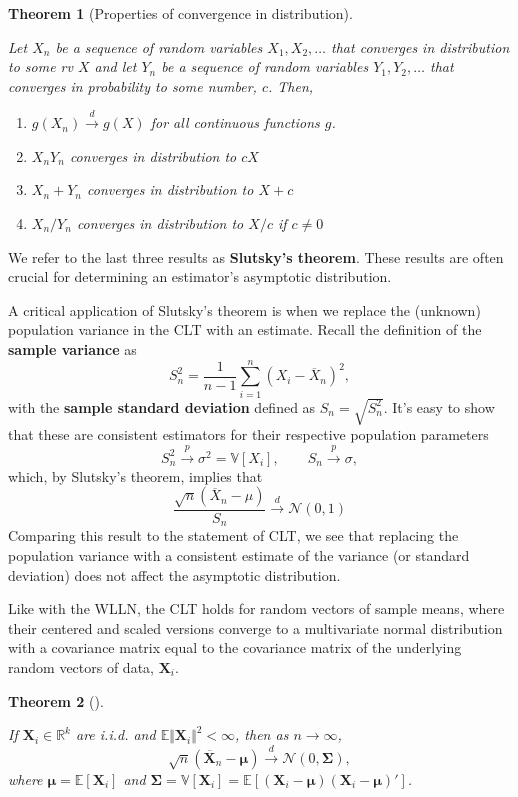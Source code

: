 \documentclass[
  13pt,
  letterpaper,
  DIV=11,
  numbers=noendperiod]{scrreprt}
\providecommand{\tightlist}{%
  \setlength{\itemsep}{0pt}\setlength{\parskip}{0pt}}\usepackage{longtable,booktabs,array}
\newcommand{\mb}{\symbf}
\newcommand{\E}{\mathbb{E}}
\newcommand{\V}{\mathbb{V}}
\newcommand{\N}{\mathcal{N}}
\newcommand{\Xbar}{\overline{X}}
\newcommand{\X}{\mb{X}}
\newcommand{\inprob}{\overset{p}{\to}}
\newcommand{\indist}{\overset{d}{\to}}
\theoremstyle{plain}
\newtheorem{theorem}{Theorem}[chapter]
\theoremstyle{definition}
\theoremstyle{definition}
\theoremstyle{remark}
\begin{document}
\begin{theorem}[Properties of convergence in
distribution]\protect\hypertarget{thm-indist-properties}{}\label{thm-indist-properties}

Let \(X_n\) be a sequence of random variables \(X_1, X_2,\ldots\) that
converges in distribution to some rv \(X\) and let \(Y_n\) be a sequence
of random variables \(Y_1, Y_2,\ldots\) that converges in probability to
some number, \(c\). Then,

\begin{enumerate}
\def\labelenumi{\arabic{enumi}.}
\tightlist
\item
  \(g(X_n) \indist g(X)\) for all continuous functions \(g\).
\item
  \(X_nY_n\) converges in distribution to \(cX\)
\item
  \(X_n + Y_n\) converges in distribution to \(X + c\)
\item
  \(X_n / Y_n\) converges in distribution to \(X / c\) if \(c \neq 0\)
\end{enumerate}

\end{theorem}

We refer to the last three results as \textbf{Slutsky's theorem}. These
results are often crucial for determining an estimator's asymptotic
distribution.

A critical application of Slutsky's theorem is when we replace the
(unknown) population variance in the CLT with an estimate. Recall the
definition of the \textbf{sample variance} as \[
S_n^2 = \frac{1}{n-1} \sum_{i=1}^n (X_i - \Xbar_n)^2,
\] with the \textbf{sample standard deviation} defined as
\(S_{n} = \sqrt{S_{n}^2}\). It's easy to show that these are consistent
estimators for their respective population parameters \[ 
S_{n}^2 \inprob \sigma^2 = \V[X_i], \qquad S_{n} \inprob \sigma,
\] which, by Slutsky's theorem, implies that \[
\frac{\sqrt{n}\left(\Xbar_n - \mu\right)}{S_n} \indist \N(0, 1)
\] Comparing this result to the statement of CLT, we see that replacing
the population variance with a consistent estimate of the variance (or
standard deviation) does not affect the asymptotic distribution.

Like with the WLLN, the CLT holds for random vectors of sample means,
where their centered and scaled versions converge to a multivariate
normal distribution with a covariance matrix equal to the covariance
matrix of the underlying random vectors of data, \(\X_i\).

\begin{theorem}[]\protect\hypertarget{thm-multivariate-clt}{}\label{thm-multivariate-clt}

If \(\mb{X}_i \in \mathbb{R}^k\) are i.i.d. and
\(\E\Vert \mb{X}_i \Vert^2 < \infty\), then as \(n \to \infty\), \[
\sqrt{n}\left( \overline{\mb{X}}_n - \mb{\mu}\right) \indist \N(0, \mb{\Sigma}),
\] where \(\mb{\mu} = \E[\mb{X}_i]\) and
\(\mb{\Sigma} = \V[\mb{X}_i] = \E\left[(\mb{X}_i-\mb{\mu})(\mb{X}_i - \mb{\mu})'\right]\).

\end{theorem}
\end{document}
